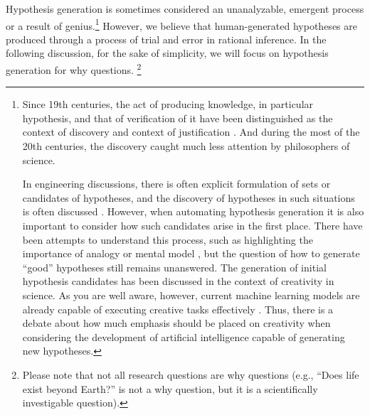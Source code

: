 \documentclass{book}
\begin{document}
Hypothesis generation is sometimes considered an unanalyzable, emergent process or a result of genius.\footnote{
Since 19th centuries, the act of producing knowledge, in particular hypothesis, and that of verification of it have been distinguished as the context of discovery and context of justification \cite{sep-scientific-discovery}. And during the most of the 20th centuries, the discovery caught much less attention by philosophers of science.

In engineering discussions, there is often explicit formulation of sets or candidates of hypotheses, and the discovery of hypotheses in such situations is often discussed \cite{simon1973does,kitano2021nobel,bengio2022ml4sci}. However, when automating hypothesis generation it is also important to consider how such candidates arise in the first place. There have been attempts to understand this process, such as highlighting the importance of analogy \cite{thagard1984conceptual} or mental model \cite{nersessian1999model}, but the question of how to generate ``good'' hypotheses still remains unanswered. The generation of initial hypothesis candidates has been discussed in the context of creativity in science. As you are well aware, however, current machine learning models are already capable of executing creative tasks effectively \cite{sep-creativity}. Thus, there is a debate about how much emphasis should be placed on creativity when considering the development of artificial intelligence capable of generating new hypotheses.
} However, we believe that human-generated hypotheses are produced through a process of trial and error in rational inference. In the following discussion, for the sake of simplicity, we will focus on hypothesis generation for why questions. \footnote{
Please note that not all research questions are why questions (e.g., ``Does life exist beyond Earth?'' is not a why question, but it is a scientifically investigable question).
}


\end{document}

